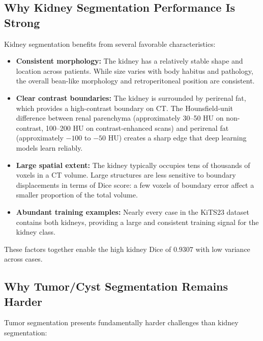 \subsection{Why Kidney Segmentation Performance Is Strong}

Kidney segmentation benefits from several favorable characteristics:

\begin{itemize}
    \item \textbf{Consistent morphology:} The kidney has a relatively stable shape and location across patients. While size varies with body habitus and pathology, the overall bean-like morphology and retroperitoneal position are consistent.
    \item \textbf{Clear contrast boundaries:} The kidney is surrounded by perirenal fat, which provides a high-contrast boundary on CT. The Hounsfield-unit difference between renal parenchyma (approximately 30--50 HU on non-contrast, 100--200 HU on contrast-enhanced scans) and perirenal fat (approximately $-100$ to $-50$ HU) creates a sharp edge that deep learning models learn reliably.
    \item \textbf{Large spatial extent:} The kidney typically occupies tens of thousands of voxels in a CT volume. Large structures are less sensitive to boundary displacements in terms of Dice score: a few voxels of boundary error affect a smaller proportion of the total volume.
    \item \textbf{Abundant training examples:} Nearly every case in the KiTS23 dataset contains both kidneys, providing a large and consistent training signal for the kidney class.
\end{itemize}

These factors together enable the high kidney Dice of $0.9307$ with low variance across cases.

\subsection{Why Tumor/Cyst Segmentation Remains Harder}

Tumor segmentation presents fundamentally harder challenges than kidney segmentation:

